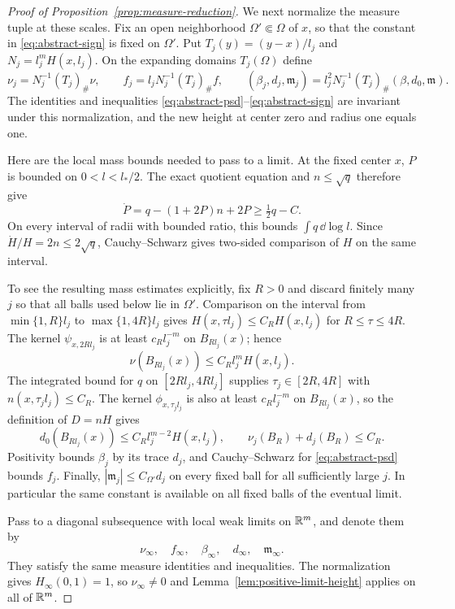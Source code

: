 \begin{proof}[Proof of Proposition~\ref{prop:measure-reduction}]
We next normalize the measure tuple at these scales. Fix an open
neighborhood $\Omega'\Subset\Omega$ of $x$, so that the constant
in \eqref{eq:abstract-sign} is fixed on $\Omega'$. Put
$T_j(y)=(y-x)/l_j$ and $N_j=l_j^m H(x,l_j)$. On the expanding
domains $T_j(\Omega)$ define
\begin{equation}
 \label{eq:second-measure-normalization}
 \nu_j=N_j^{-1}(T_j)_\#\nu,\qquad
 f_j=l_jN_j^{-1}(T_j)_\# f,\qquad
 (\beta_j,d_j,\mathfrak m_j)
   =l_j^2N_j^{-1}(T_j)_\#(\beta,d_0,\mathfrak m).
\end{equation}
The identities and inequalities
\eqref{eq:abstract-psd}--\eqref{eq:abstract-sign} are invariant under
this normalization, and the new height at center zero and radius one
equals one.

Here are the local mass bounds needed to pass to a limit. At the
fixed center $x$, $P$ is bounded on $0<l<l_*/2$. The exact quotient
equation and $n\le\sqrt q$ therefore give
\[
 \dot P=q-(1+2P)n+2P\ge\tfrac12q-C.
\]
On every interval of radii with bounded ratio, this bounds
$\int q\,\dd\log l$. Since
$\dot H/H=2n\le2\sqrt q$, Cauchy--Schwarz gives two-sided
comparison of $H$ on the same interval.

To see the resulting mass estimates explicitly, fix $R>0$ and discard
finitely many $j$ so that all balls used below lie in $\Omega'$.
Comparison on the interval from $\min\{1,R\}l_j$ to
$\max\{1,4R\}l_j$ gives
$H(x,\tau l_j)\le C_RH(x,l_j)$ for $R\le\tau\le4R$.
The kernel $\psi_{x,2Rl_j}$ is at least $c_Rl_j^{-m}$ on
$B_{Rl_j}(x)$; hence
\[
 \nu(B_{Rl_j}(x))\le C_Rl_j^mH(x,l_j).
\]
The integrated bound for $q$ on $[2Rl_j,4Rl_j]$ supplies
$\tau_j\in[2R,4R]$ with $n(x,\tau_jl_j)\le C_R$.
The kernel $\phi_{x,\tau_jl_j}$ is also at least
$c_Rl_j^{-m}$ on $B_{Rl_j}(x)$, so the definition of $D=nH$ gives
\[
 d_0(B_{Rl_j}(x))\le C_Rl_j^{m-2}H(x,l_j),\qquad
 \nu_j(B_R)+d_j(B_R)\le C_R.
\]
Positivity bounds $\beta_j$ by its trace $d_j$, and
Cauchy--Schwarz for \eqref{eq:abstract-psd} bounds $f_j$.
Finally, $|\mathfrak m_j|\le C_{\Omega'}d_j$ on every fixed ball
for all sufficiently large $j$. In particular the same constant
is available on all fixed balls of the eventual limit.

Pass to a diagonal subsequence with local weak limits on $\mathbb R^m$,
and denote them by
\[
 \nu_\infty,\quad f_\infty,\quad\beta_\infty,\quad
 d_\infty,\quad\mathfrak m_\infty.
\]
They satisfy the same measure identities and
inequalities. The normalization gives
$H_\infty(0,1)=1$, so $\nu_\infty\ne0$ and
Lemma~\ref{lem:positive-limit-height} applies on all of $\mathbb R^m$.


\end{proof}

